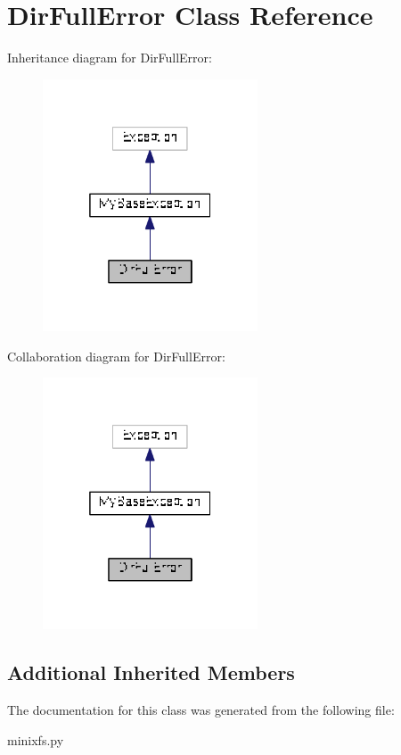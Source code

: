 \hypertarget{classminixfs_1_1_dir_full_error}{}\section{Dir\+Full\+Error Class Reference}
\label{classminixfs_1_1_dir_full_error}


Inheritance diagram for Dir\+Full\+Error\+:
\nopagebreak
\begin{figure}[H]
\begin{center}
\leavevmode
\includegraphics[width=181pt]{classminixfs_1_1_dir_full_error__inherit__graph}
\end{center}
\end{figure}


Collaboration diagram for Dir\+Full\+Error\+:
\nopagebreak
\begin{figure}[H]
\begin{center}
\leavevmode
\includegraphics[width=181pt]{classminixfs_1_1_dir_full_error__coll__graph}
\end{center}
\end{figure}
\subsection*{Additional Inherited Members}


The documentation for this class was generated from the following file\+:\begin{DoxyCompactItemize}
\item 
minixfs.\+py\end{DoxyCompactItemize}
